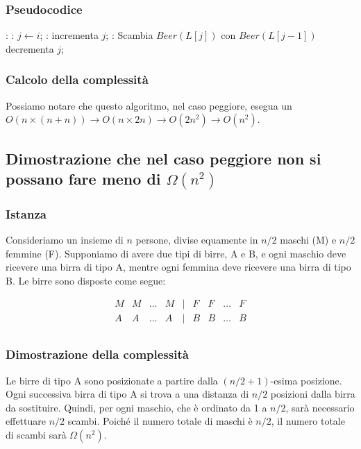 \documentclass{article}
\begin{document}
	\subsubsection{Pseudocodice}
	\begin{algorithmic}
			:  
				:
					\State $j \gets i$;
					: 
						\State incrementa $j$;
					\EndWhile
					: 
						\State Scambia $Beer(L[j])$ con $Beer(L[j-1])$ 
						\State decrementa $j$;
					\EndWhile
				\EndIf
			\EndFor
		\EndFunction
	\end{algorithmic}
	
	\subsubsection{Calcolo della complessità}
	Possiamo notare che questo algoritmo, nel caso peggiore, esegua un $O(n \times (n+n)) \rightarrow O(n \times 2n) \rightarrow O(2n^2) \rightarrow O(n^2)$.
\subsection{Dimostrazione che nel caso peggiore non si possano fare meno di $\Omega(n^2)$}

	\subsubsection{Istanza}
	Consideriamo un insieme di $n$ persone, divise equamente in $n/2$ maschi (M) e $n/2$ femmine (F). Supponiamo di avere due tipi di birre, A e B, e ogni maschio deve ricevere una birra di tipo A, mentre ogni femmina deve ricevere una birra di tipo B. Le birre sono disposte come segue:
	
	\[
	\begin{array}{cccccccccc}
		M & M & \ldots & M & | & F & F & \ldots & F \\
		A & A & \ldots & A & | & B & B & \ldots & B \\
	\end{array}
	\]
	\subsubsection{Dimostrazione della complessità}
	Le birre di tipo A sono posizionate a partire dalla $(n/2 + 1)$-esima posizione. Ogni successiva birra di tipo A si trova a una distanza di $n/2$ posizioni dalla birra da sostituire. Quindi, per ogni maschio, che è ordinato da 1 a $n/2$, sarà necessario effettuare $n/2$ scambi. Poiché il numero totale di maschi è $n/2$, il numero totale di scambi sarà $\Omega(n^2)$.
	
\end{document}

